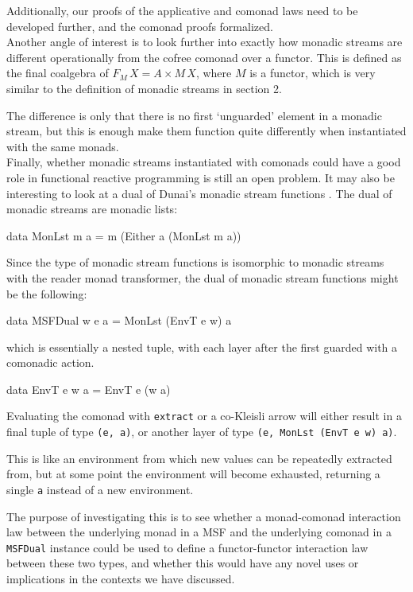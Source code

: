 Additionally, our proofs of the applicative and comonad laws need to be developed further, and the comonad proofs formalized. \\

Another angle of interest is to look further into exactly how monadic streams are different operationally from the cofree comonad over a functor. This is defined as the final coalgebra of $F_M\,X = A \times M\,X$, where $M$ is a functor, which is very similar to the definition of monadic streams in section 2.

The difference is only that there is no first `unguarded' element in a monadic stream, but this is enough make them function quite differently when instantiated with the same monads. \\

Finally, whether monadic streams instantiated with comonads could have a good role in functional reactive programming is still an open problem. It may also be interesting to look at a dual of Dunai's monadic stream functions \cite{dunai}. The dual of monadic streams are monadic lists:
\begin{haskell}
data MonLst m a = m (Either a (MonLst m a)) 
\end{haskell}
Since the type of monadic stream functions is isomorphic to monadic streams with the reader monad transformer, the dual of monadic stream functions might be the following:
\begin{haskell}
data MSFDual w e a = MonLst (EnvT e w) a
\end{haskell}
which is essentially a nested tuple, with each layer after the first guarded with a comonadic action. 

\begin{haskell}
data EnvT e w a = EnvT e (w a)
\end{haskell}

Evaluating the comonad with \verb+extract+ or a co-Kleisli arrow will either result in a final tuple of type \verb+(e, a)+, or another layer of type \verb+(e, MonLst (EnvT e w) a)+.

This is like an environment from which new values can be repeatedly extracted from, but at some point the environment will become exhausted, returning a single \verb+a+ instead of a new environment.

The purpose of investigating this is to see whether a monad-comonad interaction law \cite{uustalu:2019} between the underlying monad in a MSF and the underlying comonad in a \verb+MSFDual+ instance could be used to define a functor-functor interaction law between these two types, and whether this would have any novel uses or implications in the contexts we have discussed.
